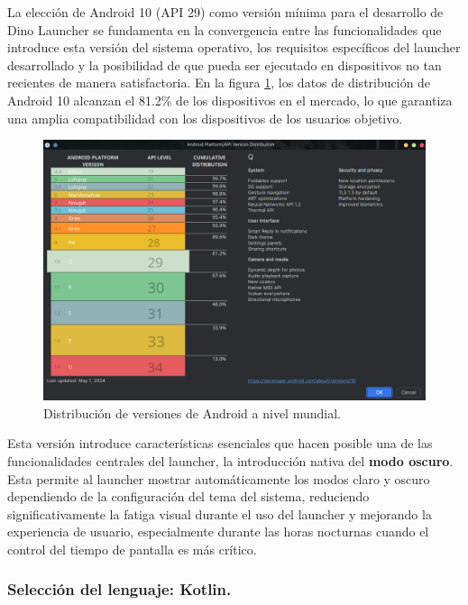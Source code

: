 La elección de Android 10 (API 29) como versión mínima para el desarrollo de Dino Launcher se fundamenta en la convergencia entre las funcionalidades que introduce esta versión del sistema operativo, los requisitos específicos del launcher desarrollado y la posibilidad de que pueda ser ejecutado en dispositivos no tan recientes de manera satisfactoria. En la figura \ref{fig:versiones_android}, los datos de distribución de Android 10 alcanzan el 81.2\% de los dispositivos en el mercado, lo que garantiza una amplia compatibilidad con los dispositivos de los usuarios objetivo. 

\begin{figure}[ht]
\caption{Distribución de versiones de Android a nivel mundial. \cite{AndroidStudio}}
\label{fig:versiones_android}
\includegraphics[width=\textwidth]{Figuras/versiones_android.png}
\centering
\end{figure}

Esta versión introduce características esenciales que hacen posible una de las funcionalidades centrales del launcher, la introducción nativa del \textbf{modo oscuro}. Esta permite al launcher mostrar automáticamente los modos claro y oscuro dependiendo de la configuración del tema del sistema, reduciendo significativamente la fatiga visual durante el uso del launcher y mejorando la experiencia de usuario, especialmente durante las horas nocturnas cuando el control del tiempo de pantalla es más crítico. 

\subsubsection{Selección del lenguaje: Kotlin.}

